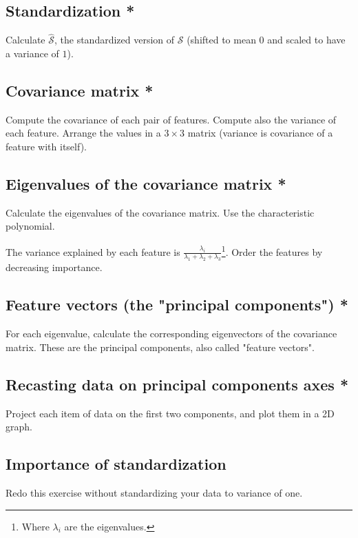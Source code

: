 \documentclass[]{article}
\begin{document}
	\subsection{Standardization *}
	Calculate $\hat{\mathcal{S}}$, the standardized version of $\mathcal{S}$ (shifted to mean $0$ and scaled to have a variance of $1$).
	
	\subsection{Covariance matrix *}
	Compute the covariance of each pair of features.
	Compute also the variance of each feature.
	Arrange the values in a $3 \times 3$ matrix (variance is covariance of a feature with itself).
	
	\subsection{Eigenvalues of the covariance matrix *}
	Calculate the eigenvalues of the covariance matrix.
	Use the characteristic polynomial.
	
	The variance explained by each feature is $\frac{\lambda_i}{\lambda_1+\lambda_2+\lambda_3}$\footnote{Where $\lambda_i$ are the eigenvalues.}.
	Order the features by decreasing importance.
	
	\subsection{Feature vectors (the "principal components") *}
	For each eigenvalue, calculate the corresponding eigenvectors of the covariance matrix.
	These are the principal components, also called "feature vectors".
	
	\subsection{Recasting data on principal components axes *}
	Project each item of data on the first two components, and plot them in a 2D graph.
	
	\subsection{Importance of standardization}
	Redo this exercise without standardizing your data to variance of one.
	
\end{document}
